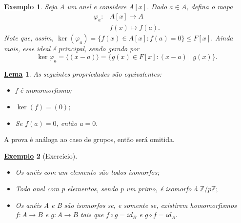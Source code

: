 \documentclass{article}
\newtheorem*{lemma*}{\underline{Lema}}
\newtheorem{example}{\underline{Exemplo}}
\begin{document}
\begin{example}
  Seja A um anel e considere \(A[x].\) Dado \(a\in A\), defina o mapa
  \begin{align*}
    \varphi_{a}:&A[x]\rightarrow A\\
                &f(x)\mapsto f(a).
  \end{align*}
  Note que, assim, \(\ker{(\varphi_{a})} = \{f(x)\in A[x]: f(a) = 0\} \trianglelefteq F[x].\) Ainda mais, esse ideal é principal, sendo gerado por 
  \[
    \ker{\varphi_{a}} = \langle (x-a) \rangle = \{g(x)\in F[x]: (x-a)\mid g(x)\}.
  \]
\end{example}
\begin{lemma*}
  As seguintes propriedades são equivalentes:
  \begin{itemize}
    \item[1)] f é monomorfismo;
    \item[2)] \(\ker{(f)} = (0);\)
    \item[3)] Se \(f(a) = 0\), então \(a=0.\)
  \end{itemize}
\end{lemma*}
A prova é análoga ao caso de grupos, então será omitida.
\begin{example}[Exercício]
  \begin{itemize}
    \item[1)] Os anéis com um elemento são todos isomorfos;
    \item[2)] Todo anel com p elementos, sendo p um primo, é isomorfo à \(\mathbb{Z}/p \mathbb{Z};\)
    \item[3)] Os anéis A e B são isomorfos se, e somente se, existirem homomorfismos
      \(f:A\rightarrow B\) e \(g:A\rightarrow B\) tais que \(f\circ{g}=id_{B}\) e \(g\circ{f} = id_{A}.\)
  \end{itemize} 
\end{example}
\end{document}

